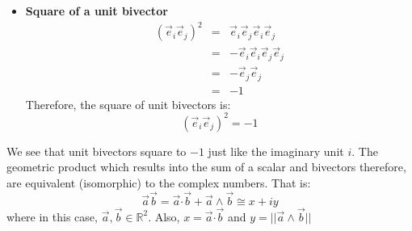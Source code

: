 \documentclass[12pt,onecolumn,letterpaper]{article} %
\begin{document}
   \begin{itemize}
       \item \textbf{Square of a unit bivector}
         \begin{eqnarray*}
    (\vec{e}_i\vec{e}_j)^2&=&\vec{e}_i\vec{e}_j\vec{e}_i\vec{e}_j\\
     &=&-\vec{e}_i\vec{e}_i\vec{e}_j\vec{e}_j\\
   &=& -\vec{e}_j\vec{e}_j\\
    &=& -1
\end{eqnarray*}
Therefore, the square of unit bivectors is:
$$(\vec{e}_i\vec{e}_j)^2=-1$$
   \end{itemize}
We see that unit bivectors square to $-1$ just like the imaginary unit $i$. The geometric product which results into the sum of a scalar and bivectors therefore, are equivalent (isomorphic) to the complex numbers. That is:
\begin{equation}
    \vec{a}\vec{b}=\vec{a} \boldsymbol{\cdot} \vec{b}+\vec{a}\wedge\vec{b}\cong x+iy\label{uform}
\end{equation}
where in this case, $\vec{a},\vec{b}\in\mathbb{R}^{2}$. Also,  $x=\vec{a} \boldsymbol{\cdot} \vec{b}$ and $y=||\vec{a}\wedge\vec{b}||$
\end{document}
